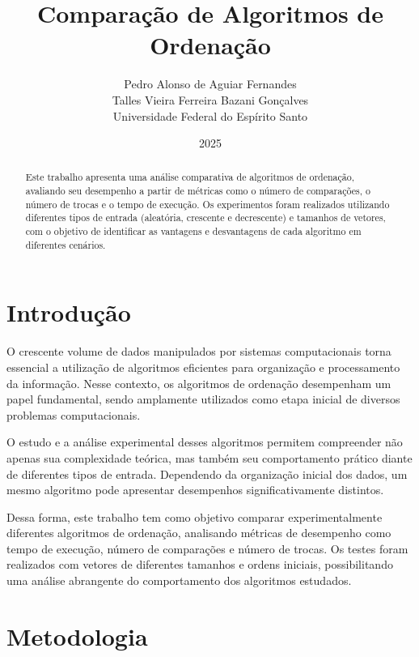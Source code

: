 \documentclass[12pt]{article}
\title{Comparação de Algoritmos de Ordenação}
\author{
Pedro Alonso de Aguiar Fernandes \\
Talles Vieira Ferreira Bazani Gonçalves \\
Universidade Federal do Espírito Santo
}
\date{2025}
\begin{document}
\maketitle

\begin{abstract}
Este trabalho apresenta uma análise comparativa de algoritmos de ordenação, avaliando
seu desempenho a partir de métricas como o número de comparações, o número de trocas e
o tempo de execução. Os experimentos foram realizados utilizando diferentes tipos de entrada
(aleatória, crescente e decrescente) e tamanhos de vetores, com o objetivo de identificar as
vantagens e desvantagens de cada algoritmo em diferentes cenários.
\end{abstract}

\newpage

\setcounter{tocdepth}{2}
\tableofcontents

\newpage

\section{Introdução}

O crescente volume de dados manipulados por sistemas computacionais torna essencial
a utilização de algoritmos eficientes para organização e processamento da informação.
Nesse contexto, os algoritmos de ordenação desempenham um papel fundamental, sendo
amplamente utilizados como etapa inicial de diversos problemas computacionais.

O estudo e a análise experimental desses algoritmos permitem compreender não apenas
sua complexidade teórica, mas também seu comportamento prático diante de diferentes
tipos de entrada. Dependendo da organização inicial dos dados, um mesmo algoritmo pode
apresentar desempenhos significativamente distintos.

Dessa forma, este trabalho tem como objetivo comparar experimentalmente diferentes
algoritmos de ordenação, analisando métricas de desempenho como tempo de execução,
número de comparações e número de trocas. Os testes foram realizados com vetores de
diferentes tamanhos e ordens iniciais, possibilitando uma análise abrangente do
comportamento dos algoritmos estudados.

\section{Metodologia}
\end{document}

